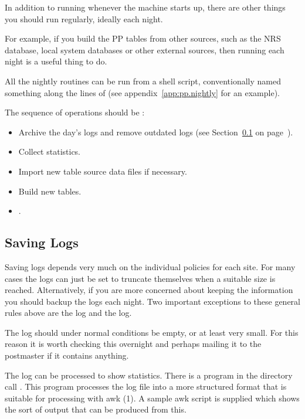 In addition to running  whenever the machine starts up,
there are other things you should run regularly, ideally each night.

For example, if you build the PP tables from other sources, such as
the NRS database, local system databases or other external sources,
then running  each night is a useful thing to do.

All the nightly routines can be run from a shell script,
conventionally named something along the lines of  (see
appendix~\ref{app:pp.nightly} for an example).

The sequence of operations should be :
\begin{itemize}
        \item   Archive the day's logs and remove outdated logs (see
		Section~\ref{sect:logs} on 
 		\linebreak page~\pageref{sect:logs}).
	\item	Collect statistics.
        \item   Import new table source data files if necessary.
        \item   Build new tables.
        \item   {}.
\end{itemize}

\subsection {Saving Logs}\label{sect:logs}

Saving logs depends very much on the individual policies for each
site. For many cases the logs can just be set to truncate themselves
when a suitable size is reached. Alternatively, if you are more
concerned about keeping the information you should backup the logs
each night.  Two important exceptions to these general rules above are
the  log and the  log.

The  log should under normal conditions be empty, or at
least very small. For this reason it is worth checking this overnight
and perhaps mailing it to the postmaster if it contains anything.

The  log can be processed to show statistics. There is a
program in the  directory call . This program
processes the  log file into a more structured format that
is suitable for processing with \man awk (1). A sample awk script is
supplied which shows the sort of output that can be produced from
this.

